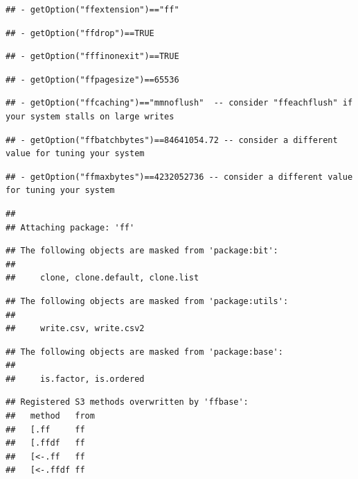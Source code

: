 \documentclass[
]{article}
\begin{document}
\begin{verbatim}
## - getOption("ffextension")=="ff"
\end{verbatim}

\begin{verbatim}
## - getOption("ffdrop")==TRUE
\end{verbatim}

\begin{verbatim}
## - getOption("fffinonexit")==TRUE
\end{verbatim}

\begin{verbatim}
## - getOption("ffpagesize")==65536
\end{verbatim}

\begin{verbatim}
## - getOption("ffcaching")=="mmnoflush"  -- consider "ffeachflush" if your system stalls on large writes
\end{verbatim}

\begin{verbatim}
## - getOption("ffbatchbytes")==84641054.72 -- consider a different value for tuning your system
\end{verbatim}

\begin{verbatim}
## - getOption("ffmaxbytes")==4232052736 -- consider a different value for tuning your system
\end{verbatim}

\begin{verbatim}
## 
## Attaching package: 'ff'
\end{verbatim}

\begin{verbatim}
## The following objects are masked from 'package:bit':
## 
##     clone, clone.default, clone.list
\end{verbatim}

\begin{verbatim}
## The following objects are masked from 'package:utils':
## 
##     write.csv, write.csv2
\end{verbatim}

\begin{verbatim}
## The following objects are masked from 'package:base':
## 
##     is.factor, is.ordered
\end{verbatim}

\begin{verbatim}
## Registered S3 methods overwritten by 'ffbase':
##   method   from
##   [.ff     ff  
##   [.ffdf   ff  
##   [<-.ff   ff  
##   [<-.ffdf ff
\end{verbatim}
\end{document}
